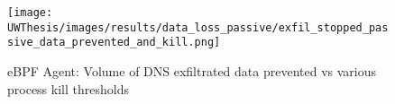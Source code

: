 \documentclass [11pt, proquest] {uwthesis}[2020/02/24]
\begin{document}
\begin{figure}[H]
  \centering
  \texttt{[image: UWThesis/images/results/data\_loss\_passive/exfil\_stopped\_passive\_data\_prevented\_and\_kill.png]}
\caption{eBPF Agent: Volume of DNS exfiltrated data prevented vs various process kill thresholds}
  \label{fig:data_loss_prev}
\end{figure}

\end{document}
